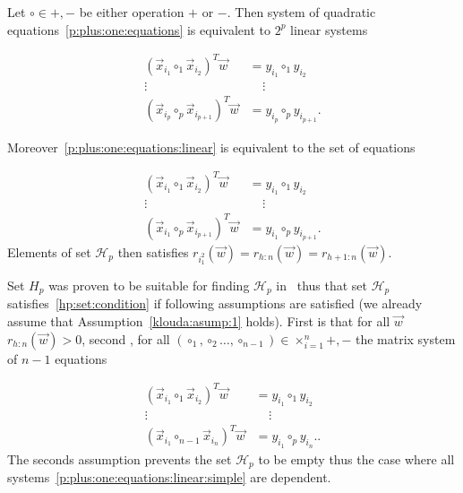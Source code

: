 Let $\circ \in {+, -}$ be either operation $+$ or $-$. Then system of quadratic equations~\eqref{p:plus:one:equations} is equivalent to $2^p$ linear systems

\begin{align} 
    (\vec{x}_{i_1} \circ_1 \vec {x}_{i_2} )^T \vec{w} &= y_{i_1} \circ_1 y_{i_2} \label{p:plus:one:equations:linear}   \\
    \vdots \ \ \  & \ \ \ \  \ \vdots  \nonumber \\ 
    (\vec{x}_{i_p} \circ_p \vec {x}_{i_{p+1}} )^T \vec{w} &= y_{i_p} \circ_p y_{i_{p+1}}. \nonumber 
\end{align}

Moreover~\eqref{p:plus:one:equations:linear} is equivalent to the set of equations


\begin{align} 
    (\vec{x}_{i_1} \circ_1 \vec {x}_{i_2} )^T \vec{w} &= y_{i_1} \circ_1 y_{i_2} \label{p:plus:one:equations:linear:simple}   \\
    \vdots \ \ \  & \ \ \ \  \ \vdots  \nonumber \\ 
    (\vec{x}_{i_1} \circ_p \vec {x}_{i_{p+1}} )^T \vec{w} &= y_{i_1} \circ_p y_{i_{p+1}}. \nonumber 
\end{align}
Elements of set $\mathcal{H}_p$ then satisfies $r_{i_1^2}(\vec{w}) = r_{h:n}(\vec{w}) = r_{h+1:n}(\vec{w})$.


Set $H_p$ was proven to be suitable for finding $\mathcal{H}_p$ in~\cite{klouda2015exact} thus that set $\mathcal{H}_p$ satisfies~\eqref{hp:set:condition} if following assumptions are satisfied (we already assume that Assumption~\ref{klouda:asump:1} holds). First is that for all $\vec{w}$ $r_{h:n}(\vec{w}) > 0$, second , for all 
$(\circ_1,\circ_2 \ldots,  \circ_{n-1}) \in \times^n_{i=1} {+, -}$ the matrix system of $n-1$ equations

\begin{align} 
    (\vec{x}_{i_1} \circ_1 \vec {x}_{i_2} )^T \vec{w} &= y_{i_1} \circ_1 y_{i_2} \label{p:plus:one:equations:linear:simple:to:n}   \\
    \vdots \ \ \  & \ \ \ \  \ \vdots  \nonumber \\ 
    (\vec{x}_{i_1} \circ_{n-1} \vec {x}_{i_{n}} )^T \vec{w} &= y_{i_1} \circ_p y_{i_{n}}. \nonumber.
\end{align}
The seconds assumption prevents the set $\mathcal{H}_p$ to be empty thus the case where all systems~\eqref{p:plus:one:equations:linear:simple} are dependent. 

